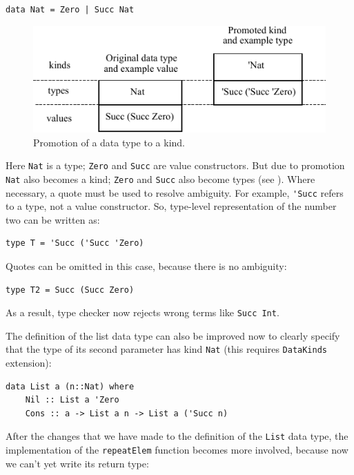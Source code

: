 \documentclass{tmr}
\begin{document}
\begin{Verbatim}
data Nat = Zero | Succ Nat
\end{Verbatim}

\begin{figure}
\centering
\includegraphics{promotion}
\vspace{5pt}
\caption{Promotion of a data type to a kind.}
\label{fig:promotion}
\end{figure}

Here \verb|Nat| is a type; \verb|Zero| and \verb|Succ| are value constructors. But due to promotion~\cite{promotion} \verb|Nat| also becomes a kind; \verb|Zero| and \verb|Succ| also become types (see ). Where necessary, a quote must be used to resolve ambiguity. For example, \verb|'Succ| refers to a type, not a value constructor. So, type-level representation of the number two can be written as:

\begin{Verbatim}
type T = 'Succ ('Succ 'Zero)
\end{Verbatim}

Quotes can be omitted in this case, because there is no ambiguity:

\begin{Verbatim}
type T2 = Succ (Succ Zero)
\end{Verbatim}

As a result, type checker now rejects wrong terms like \verb|Succ Int|.

The definition of the list data type can also be improved now to clearly specify that the type of its second parameter has kind \verb|Nat| (this requires \verb|DataKinds| extension):

\begin{Verbatim}
data List a (n::Nat) where
    Nil :: List a 'Zero
    Cons :: a -> List a n -> List a ('Succ n)
\end{Verbatim}

After the changes that we have made to the definition of the \verb|List| data type, the implementation of the \verb|repeatElem| function becomes more involved, because now we can't yet write its return type:
\end{document}
